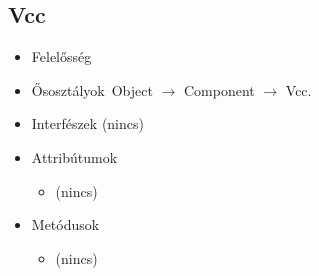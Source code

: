 \subsection{Vcc}
\begin{itemize}
\item Felelősség\\

\item Ősosztályok\ Object $\rightarrow{}$ Component $\rightarrow{}$ Vcc.
\item Interfészek (nincs)
\item Attribútumok $\ $
\begin{itemize}
\item (nincs)
\end{itemize}
\item Metódusok$\ $
\begin{itemize}
\item (nincs)
\end{itemize}
\end{itemize}


